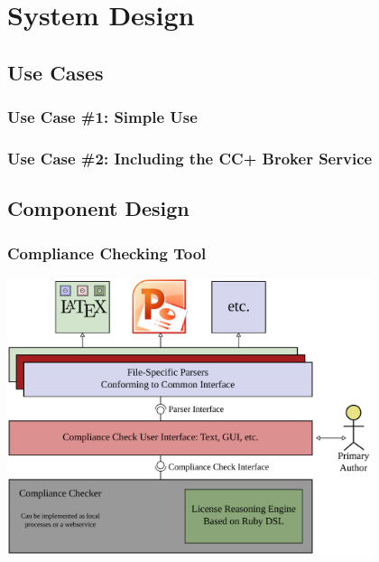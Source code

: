 \documentclass[mathserif,xcolor=dvipsnames,handout]{beamer}
\begin{document}
\section{System Design}

    \subsection{Use Cases}

    \begin{frame}[t]
        \frametitle{Use Case \#1: Simple Use}
        \begin{center}
        \end{center}
    \end{frame}

    \begin{frame}[t]
        \frametitle{Use Case \#2: Including the CC+ Broker Service}
        \begin{center}
        \end{center}
    \end{frame}

    \subsection{Component Design}

    \begin{frame}[t]
        \frametitle{Compliance Checking Tool}
        \begin{center}
            \includegraphics[width=0.8\textwidth]{compliance-checking-tool.pdf}
        \end{center}
    \end{frame}
\end{document}
